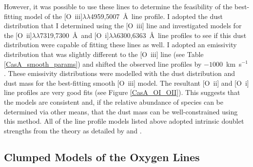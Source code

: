 However, it was possible to use these lines to determine the feasibility of the best-fitting model of the  [O~{\sc iii}]$\lambda\lambda$4959,5007~\AA\  line profile.  I adopted the dust distribution that I determined using the [O~{\sc iii}] line and investigated models for the [O~{\sc ii}]$\lambda\lambda$7319,7300~\AA\  and [O~{\sc i}]$\lambda\lambda$6300,6363~\AA\  line profiles to see if this dust distribution were capable of fitting these lines as well.  I adopted an emissivity distribution that was slightly different to the [O~{\sc iii}] line (see Table \ref{CasA_smooth_params}) and shifted the observed line profiles by $-1000$~km~s$^{-1}$.  These emissivity distributions were modelled with the dust distribution and dust mass for the best-fitting smooth [O~{\sc iii}] model.  The resultant [O~{\sc ii}] and [O~{\sc i}] line profiles are very good fits (see Figure \ref{CasA_OI_OII}).  This suggests that the models are consistent and, if the relative abundance of species can be determined via other means, that the dust mass can be well-constrained using this method.  All of the line profile models listed above adopted intrinsic doublet strengths from the theory as detailed by \citet{Zeippen1987} and \citet{Storey2000}.  



\subsection{Clumped Models of the Oxygen Lines}

